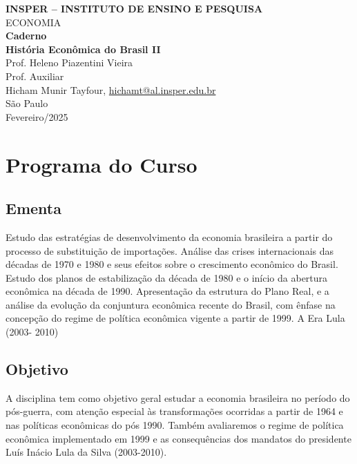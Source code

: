 \documentclass[a4paper,12pt]{article}[abntex2]
\begin{document}
\begin{titlepage}
    \centering
    \vspace*{1cm}
    \Large\textbf{INSPER – INSTITUTO DE ENSINO E PESQUISA}\\
    \Large ECONOMIA\\
    \vspace{1.5cm}
    \Large\textbf{Caderno}\\
    \textbf{História Econômica do Brasil II}\\
    \vspace{1.5cm}
    Prof. Heleno Piazentini Vieira \\
    Prof. Auxiliar  \\
    \vfill
    \normalsize
    Hicham Munir Tayfour, \href{mailto:hichamt@al.insper.edu.br}{hichamt@al.insper.edu.br}\\

    \vfill
    São Paulo\\
    Fevereiro/2025
\end{titlepage}

\newpage
\tableofcontents
\thispagestyle{empty} %

\newpage 
\listoffigures
\thispagestyle{empty} %

\newpage
\setcounter{page}{1} %
\justify
\onehalfspacing


\section*{\textbf{Programa do Curso}}
\subsection*{\textbf{Ementa}}
Estudo das estratégias de desenvolvimento da economia brasileira a partir do processo de substituição de importações. Análise das crises internacionais das décadas de 1970 e 1980 e seus efeitos sobre o crescimento econômico do Brasil. Estudo dos planos de estabilização da década de 1980 e o início da abertura econômica na década de 1990. Apresentação da estrutura do Plano Real, e a análise da evolução da conjuntura econômica recente do Brasil, com ênfase na concepção do regime de política econômica vigente a partir de 1999. A Era Lula (2003- 2010)

\subsection*{\textbf{Objetivo}}
A disciplina tem como objetivo geral estudar a economia brasileira no período do pós-guerra, com atenção especial às transformações ocorridas a partir de 1964 e nas políticas econômicas do pós 1990. Também avaliaremos o regime de política econômica implementado em 1999 e as consequências dos mandatos do presidente Luís Inácio Lula da Silva (2003-2010).
\end{document}
